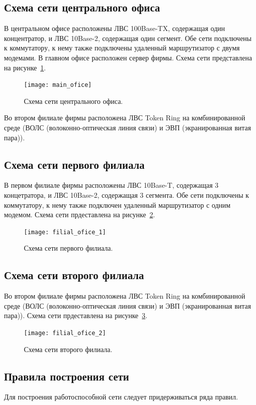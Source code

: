 \documentclass[russian,utf8,emptystyle]{eskdtext}
\begin{document}
\clearpage
\subsection{Схема сети центрального офиса}
В центральном офисе расположены ЛВС 100Base-TX, содержащая один концентратор, и ЛВС 10Base-2, содержащая один сегмент. Обе сети подключены к коммутатору, к нему также подключены удаленный маршрутизатор с двумя модемами. В главном офисе расположен сервер фирмы. Схема сети представлена на рисунке~\ref{fig:main-ofice}.

\begin{figure}[h!]
\centering
\texttt{[image: main\_ofice]}
\caption{Схема сети центрального офиса.}
\label{fig:main-ofice}
\end{figure}
Во втором филиале фирмы расположена ЛВС Token Ring на комбинированной среде (ВОЛС (волоконно-оптическая линия связи) и ЭВП (экранированная витая пара)). 
\clearpage
\subsection{Схема сети первого филиала}
В первом филиале фирмы расположены ЛВС 10Base-T, содержащая 3 концетратора, и ЛВС 10Base-2, содержащая 3 сегмента. Обе сети подключены к коммутатору, к нему также подключен удаленный маршрутизатор с одним модемом. Схема сети прдеставлена на рисунке~\ref{fig:filial-ofice-1}.

\begin{figure}[h!]
\centering
\texttt{[image: filial\_ofice\_1]}
\caption{Схема сети первого филиала.}
\label{fig:filial-ofice-1}
\end{figure}


\clearpage
\subsection{Схема сети второго филиала}
Во втором филиале фирмы расположена ЛВС Token Ring на комбинированной среде (ВОЛС (волоконно-оптическая линия связи) и ЭВП (экранированная витая пара)). Схема сети прдеставлена на рисунке~\ref{fig:filial-ofice-2}.

\begin{figure}[h!]
\centering
\texttt{[image: filial\_ofice\_2]}
\caption{Схема сети второго филиала.}
\label{fig:filial-ofice-2}
\end{figure}

\clearpage
\subsection{Правила построения сети}
Для построения работоспособной сети следует придерживаться ряда правил.
\end{document}
